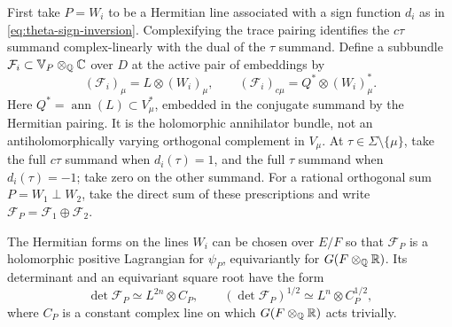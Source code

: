 First take \(P=W_i\) to be a Hermitian line associated with a sign
function \(d_i\) as in \eqref{eq:theta-sign-inversion}.  Complexifying
the trace pairing identifies the \(c\tau\) summand complex-linearly
with the dual of the \(\tau\) summand.  Define a subbundle
\(\mathcal F_i\subset\mathbb V_P\otimes_{\mathbb{Q}}\mathbb{C}\) over \(D\) at the
active pair of embeddings by
\begin{equation}\label{eq:theta-active-lagrangian}
 (\mathcal F_i)_\mu=L\otimes(W_i)_\mu,\qquad
 (\mathcal F_i)_{c\mu}=Q^*\otimes(W_i)_\mu^*.
\end{equation}
Here \(Q^*=\operatorname{ann}(L)\subset V_\mu^*\), embedded in
the conjugate summand by the Hermitian pairing.  It is the
holomorphic annihilator bundle, not an antiholomorphically varying
orthogonal complement in \(V_\mu\).  At
\(\tau\in\Sigma\setminus\{\mu\}\), take the full \(c\tau\) summand
when \(d_i(\tau)=1\), and the full \(\tau\) summand when
\(d_i(\tau)=-1\); take zero on the other summand.  For a rational
orthogonal sum \(P=W_1\perp W_2\), take the direct sum of these
prescriptions and write \(\mathcal F_P=\mathcal F_1\oplus\mathcal F_2\).

\begin{lemma}\label{lem:theta-positive-lagrangian}
The Hermitian forms on the lines \(W_i\) can be chosen over \(E/F\)
so that \(\mathcal F_P\) is a holomorphic positive Lagrangian for
\(\psi_P\), equivariantly for \(G(F\otimes_{\mathbb{Q}}\mathbb{R})\).  Its determinant
and an equivariant square root have the form
\begin{equation}\label{eq:theta-halfdet}
 \det\mathcal F_P\simeq L^{2n}\otimes C_P,\qquad
 (\det\mathcal F_P)^{1/2}\simeq L^n\otimes C_P^{1/2},
\end{equation}
where \(C_P\) is a constant complex line on which
\(G(F\otimes_{\mathbb{Q}}\mathbb{R})\) acts trivially.
\end{lemma}

